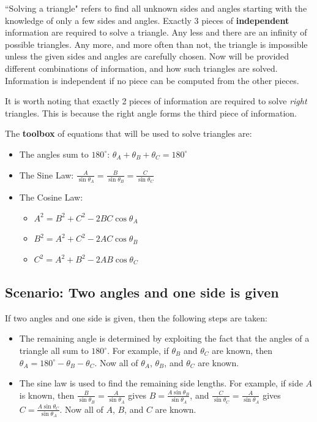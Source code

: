 \documentclass{article}
\begin{document}
``Solving a triangle" refers to find all unknown sides and angles starting with the knowledge of only a few sides and angles. Exactly 3 pieces of {\bf independent} information are required to solve a triangle. Any less and there are an infinity of possible triangles. Any more, and more often than not, the triangle is impossible unless the given sides and angles are carefully chosen. Now will be provided different combinations of information, and how such triangles are solved. Information is independent if no piece can be computed from the other pieces.

It is worth noting that exactly 2 pieces of information are required to solve \emph{right} triangles. This is because the right angle forms the third piece of information.

The {\bf toolbox} of equations that will be used to solve triangles are:
\begin{itemize}
\item The angles sum to \(180^\circ\): \(\theta_A + \theta_B + \theta_C = 180^\circ\)
\item The Sine Law: \(\frac{A}{\sin\theta_A} = \frac{B}{\sin\theta_B} = \frac{C}{\sin\theta_C}\)
\item The Cosine Law: 
	\begin{itemize}
	\item[\textasteriskcentered] \(A^2 = B^2 + C^2 - 2BC\cos\theta_A\)
	\item[\textasteriskcentered] \(B^2 = A^2 + C^2 - 2AC\cos\theta_B\)
	\item[\textasteriskcentered] \(C^2 = A^2 + B^2 - 2AB\cos\theta_C\)
	\end{itemize}
\end{itemize}



\subsection*{Scenario: Two angles and one side is given}

If two angles and one side is given, then the following steps are taken:
\begin{itemize}
\item The remaining angle is determined by exploiting the fact that the angles of a triangle all sum to \(180^\circ\). For example, if \(\theta_B\) and \(\theta_C\) are known, then \(\theta_A = 180^\circ - \theta_B - \theta_C\). Now all of \(\theta_A\), \(\theta_B\), and \(\theta_C\) are known.
\item The sine law is used to find the remaining side lengths. For example, if side \(A\) is known, then \(\frac{B}{\sin\theta_B} = \frac{A}{\sin\theta_A}\) gives \(B = \frac{A\sin\theta_B}{\sin\theta_A}\), and \(\frac{C}{\sin\theta_C} = \frac{A}{\sin\theta_A}\) gives \(C = \frac{A\sin\theta_C}{\sin\theta_A}\). Now all of \(A\), \(B\), and \(C\) are known. 
\end{itemize}
\end{document}
